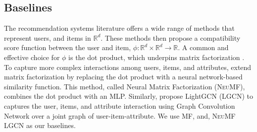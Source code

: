 \subsection{Baselines}
\vspace{-2pt}
The recommendation systems literature offers a wide range of methods that represent users, and items in $\mathbb{R}^d$. These methods then propose a compatibility score function between the user and item, $\phi: \mathbb{R}^d \times \mathbb{R}^d \rightarrow \mathbb{R}$. A common and effective choice for $\phi$ is the dot product, which underpins matrix factorization \citep{nc_vs_mf, mf_Koren2015}. To capture more complex interactions among users, items, and attributes, \cite{ncf} extend matrix factorization by replacing the dot product with a neural network-based similarity function. This method, called Neural Matrix Factorization (\textsc{NeuMF}), combines the dot product with an MLP. Similarly, \cite{lightgcn} propose LightGCN (\textsc{LGCN}) to captures the user, items, and attribute interaction using Graph Convolution Network \cite{gcn_kipf} over a joint graph of user-item-attribute. We use \textsc{MF}, and, \textsc{NeuMF} \textsc{LGCN} as our baselines.

